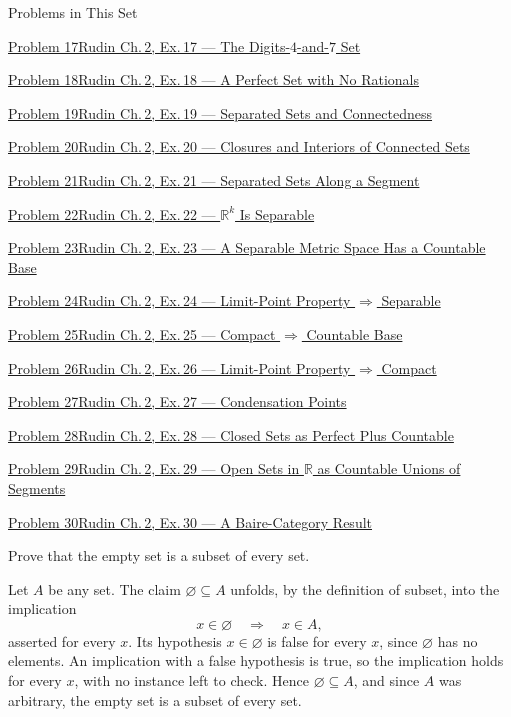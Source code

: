 \documentclass[main.tex]{subfiles}
\begin{document}
\begin{lecturecontents}{Problems in This Set}
  \item \hyperlink{prob:17}{Problem 17\quad Rudin Ch.\,2, Ex.\,17 --- The Digits-$4$-and-$7$ Set}
  \item \hyperlink{prob:18}{Problem 18\quad Rudin Ch.\,2, Ex.\,18 --- A Perfect Set with No Rationals}
  \item \hyperlink{prob:19}{Problem 19\quad Rudin Ch.\,2, Ex.\,19 --- Separated Sets and Connectedness}
  \item \hyperlink{prob:20}{Problem 20\quad Rudin Ch.\,2, Ex.\,20 --- Closures and Interiors of Connected Sets}
  \item \hyperlink{prob:21}{Problem 21\quad Rudin Ch.\,2, Ex.\,21 --- Separated Sets Along a Segment}
  \item \hyperlink{prob:22}{Problem 22\quad Rudin Ch.\,2, Ex.\,22 --- $\mathbb R^k$ Is Separable}
  \item \hyperlink{prob:23}{Problem 23\quad Rudin Ch.\,2, Ex.\,23 --- A Separable Metric Space Has a Countable Base}
  \item \hyperlink{prob:24}{Problem 24\quad Rudin Ch.\,2, Ex.\,24 --- Limit-Point Property $\Rightarrow$ Separable}
  \item \hyperlink{prob:25}{Problem 25\quad Rudin Ch.\,2, Ex.\,25 --- Compact $\Rightarrow$ Countable Base}
  \item \hyperlink{prob:26}{Problem 26\quad Rudin Ch.\,2, Ex.\,26 --- Limit-Point Property $\Rightarrow$ Compact}
  \item \hyperlink{prob:27}{Problem 27\quad Rudin Ch.\,2, Ex.\,27 --- Condensation Points}
  \item \hyperlink{prob:28}{Problem 28\quad Rudin Ch.\,2, Ex.\,28 --- Closed Sets as Perfect Plus Countable}
  \item \hyperlink{prob:29}{Problem 29\quad Rudin Ch.\,2, Ex.\,29 --- Open Sets in $\mathbb R$ as Countable Unions of Segments}
  \item \hyperlink{prob:30}{Problem 30\quad Rudin Ch.\,2, Ex.\,30 --- A Baire-Category Result}
\end{lecturecontents}

Prove that the empty set is a subset of every set.

\begin{SolutionBlue}
Let $A$ be any set. The claim $\varnothing\subseteq A$ unfolds, by the definition of subset, into the
implication
\[
x\in\varnothing \quad\Longrightarrow\quad x\in A,
\]
asserted for every $x$. Its hypothesis $x\in\varnothing$ is false for every $x$, since $\varnothing$
has no elements. An implication with a false hypothesis is true, so the implication holds for every
$x$, with no instance left to check. Hence $\varnothing\subseteq A$, and since $A$ was arbitrary, the
empty set is a subset of every set.
\end{SolutionBlue}
\end{document}
